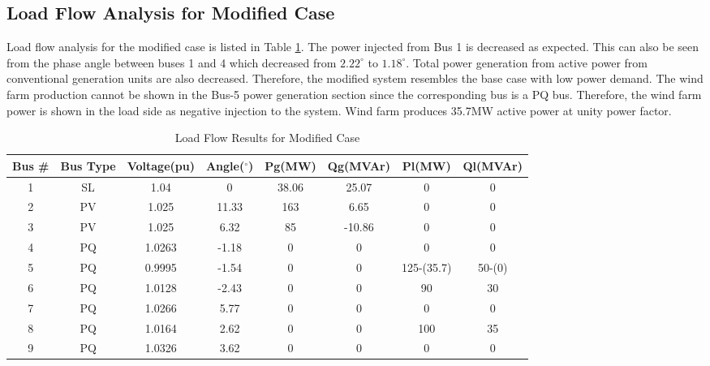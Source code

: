 \subsection{Load Flow Analysis for Modified Case}
Load flow analysis for the modified case is listed in Table \ref{loadflow_case2}. The power injected from Bus 1 is decreased as expected. This can also be seen from the phase angle between buses 1 and 4 which decreased from $2.22^{\circ}$ to $1.18^{\circ}$. Total power generation from active power from conventional generation units are also decreased. Therefore, the modified system resembles the base case with low power demand. The wind farm production cannot be shown in the Bus-5 power generation section since the corresponding bus is a PQ bus. Therefore, the wind farm power is shown in the load side as negative injection to the system. Wind farm produces 35.7MW active power at unity power factor. 
\begin{table}[h!]
	\centering
	\begin{tabular}{cclccccc}
		\hline
		Bus \# & Bus Type & \multicolumn{1}{c}{Voltage(pu)} & Angle($^{\circ}$)& Pg(MW)    & Qg(MVAr)     & Pl(MW)  & Ql(MVAr)   \\ \hline
		1      & SL       & \multicolumn{1}{c}{1.04}    & 0     & 38.06 & 25.07  & 0   & 0  \\
		2      & PV       & \multicolumn{1}{c}{1.025}   & 11.33 & 163   & 6.65   & 0   & 0  \\
		3      & PV       & \multicolumn{1}{c}{1.025}   & 6.32  & 85    & -10.86 & 0   & 0  \\
		4      & PQ       & \multicolumn{1}{c}{1.0263}  & -1.18 & 0     & 0      & 0   & 0  \\
		5      & PQ       & \multicolumn{1}{c}{0.9995}  & -1.54 & 0     & 0      & 125-(35.7) & 50-(0) \\
		6      & PQ       & \multicolumn{1}{c}{1.0128}  & -2.43 & 0     & 0      & 90  & 30 \\
		7      & PQ       & \multicolumn{1}{c}{1.0266}  & 5.77  & 0     & 0      & 0   & 0  \\
		8      & PQ       & \multicolumn{1}{c}{1.0164}  & 2.62  & 0     & 0      & 100 & 35 \\
		9      & PQ       & \multicolumn{1}{c}{1.0326}  & 3.62  & 0     & 0      & 0   & 0  \\ \hline
	\end{tabular}
	\caption{Load Flow Results for Modified Case}
	\label{loadflow_case2}
\end{table}
